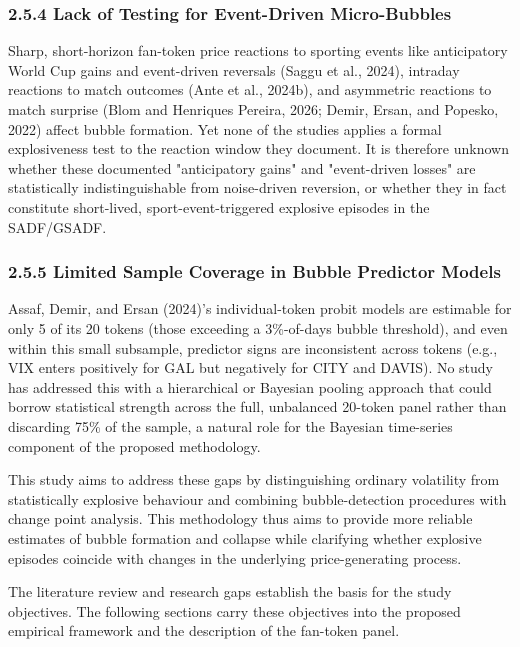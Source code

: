 \documentclass[11pt,a4paper,onecolumn]{article}
\begin{document}
\subsubsection{2.5.4 Lack of Testing for Event-Driven Micro-Bubbles}

Sharp, short-horizon fan-token price reactions to sporting events like anticipatory World Cup gains and event-driven reversals (Saggu et al., 2024), intraday reactions to match outcomes (Ante et al., 2024b), and asymmetric reactions to match surprise (Blom and Henriques Pereira, 2026; Demir, Ersan, and Popesko, 2022) affect bubble formation. Yet none of the studies applies a formal explosiveness test to the reaction window they document. It is therefore unknown whether these documented "anticipatory gains" and "event-driven losses" are statistically indistinguishable from noise-driven reversion, or whether they in fact constitute short-lived, sport-event-triggered explosive episodes in the SADF/GSADF.

\subsubsection{2.5.5 Limited Sample Coverage in Bubble Predictor Models}

 Assaf, Demir, and Ersan (2024)’s individual-token probit models are estimable for only 5 of its 20 tokens (those exceeding a 3\%-of-days bubble threshold), and even within this small subsample, predictor signs are inconsistent across tokens (e.g., VIX enters positively for GAL but negatively for CITY and DAVIS). No study has addressed this with a hierarchical or Bayesian pooling approach that could borrow statistical strength across the full, unbalanced 20-token panel rather than discarding 75\% of the sample, a natural role for the Bayesian time-series component of the proposed methodology.

This study aims to address these gaps by distinguishing ordinary volatility from statistically explosive behaviour and combining bubble-detection procedures with change point analysis. This methodology thus aims to provide more reliable estimates of bubble formation and collapse while clarifying whether explosive episodes coincide with changes in the underlying price-generating process.

The literature review and research gaps establish the basis for the study objectives. The following sections carry these objectives into the proposed empirical framework and the description of the fan-token panel.
\end{document}
